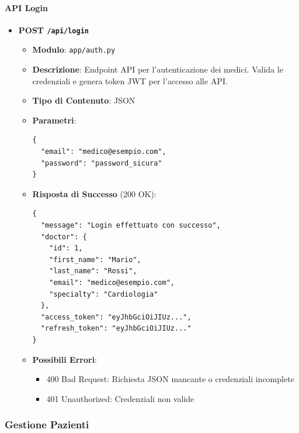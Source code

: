 \documentclass[12pt,a4paper,oneside]{report}
\begin{document}
\paragraph{API Login}
\begin{itemize}
    \item \textbf{POST \texttt{/api/login}}
          \begin{itemize}
              \item \textbf{Modulo}: \texttt{app/auth.py}
              \item \textbf{Descrizione}: Endpoint API per l'autenticazione dei medici. Valida le credenziali e genera token JWT per l'accesso alle API.
              \item \textbf{Tipo di Contenuto}: JSON
              \item \textbf{Parametri}:
                    \begin{verbatim}
{
  "email": "medico@esempio.com",
  "password": "password_sicura"
}
        \end{verbatim}
              \item \textbf{Risposta di Successo} (200 OK):
                    \begin{verbatim}
{
  "message": "Login effettuato con successo",
  "doctor": {
    "id": 1,
    "first_name": "Mario",
    "last_name": "Rossi",
    "email": "medico@esempio.com",
    "specialty": "Cardiologia"
  },
  "access_token": "eyJhbGciOiJIUz...",
  "refresh_token": "eyJhbGciOiJIUz..."
}
        \end{verbatim}
              \item \textbf{Possibili Errori}:
                    \begin{itemize}
                        \item 400 Bad Request: Richiesta JSON mancante o credenziali incomplete
                        \item 401 Unauthorized: Credenziali non valide
                    \end{itemize}
          \end{itemize}
\end{itemize}

\subsubsection{Gestione Pazienti}
\end{document}
